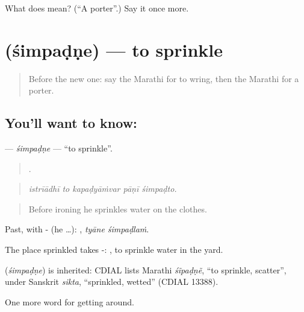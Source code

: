 \begin{tcolorbox}[breakable,colback=teal!4,colframe=teal!35!black,title={Before you move on}]
What does  mean? (\textquotedblleft{}A porter\textquotedblright{}.) Say it once more.
\end{tcolorbox}
\section[\texorpdfstring{\mr{शिंपडणे} (śimpaḍṇe)}{शिंपडणे (śimpaḍṇe)}]{ (śimpaḍṇe) — to sprinkle}

\label{lesson:MR-C416-simpadne}



\begin{quote}
Before the new one: say the Marathi for to wring, then the Marathi for a porter.
\end{quote}

\subsection*{You'll want to know: }
\textbf{} — \emph{śimpaḍṇe} — \textquotedblleft{}to sprinkle\textquotedblright{}.

\begin{quote}
    .
\end{quote}

\begin{quote}
\emph{istrīādhī to kapaḍyāṁvar pāṇī śimpaḍto.}
\end{quote}

\begin{quote}
Before ironing he sprinkles water on the clothes.
\end{quote}

Past, with - (he …):  , \emph{tyāne śimpaḍlaṁ}.

The place sprinkled takes -:   , to sprinkle water in the yard.

\begin{cousinweb}
\textbf{} (\emph{śimpaḍṇe}) is inherited: CDIAL lists Marathi \emph{śĩpaḍṇẽ}, \textquotedblleft{}to sprinkle, scatter\textquotedblright{}, under Sanskrit \emph{sikta}, \textquotedblleft{}sprinkled, wetted\textquotedblright{} (CDIAL 13388).
\end{cousinweb}

\begin{grammarlens}[title={What you've built}]
One more word for getting around.
\end{grammarlens}

